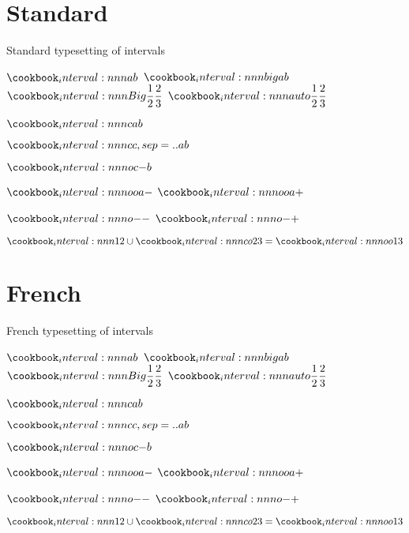 \documentclass[varwidth, border = 3pt]{standalone}
\begin{document}
\section*{Standard}
Standard typesetting of intervals

$\interval{a,b}$\quad
$\interval[big]{a,b}$\quad
$\interval[Big]{\dfrac{1}{2},\dfrac{2}{3}}$\quad
$\interval[auto]{\dfrac{1}{2},\dfrac{2}{3}}$

$\interval[c]{a,b}$

$\interval[cc,sep=..]{a,b}$

$\interval[oc]{-,b}$

$\interval[oo]{a,-}$\qquad
$\interval[oo]{a,+}$

$\interval[o]{-,-}$\qquad
$\interval[o]{-,+}$

$\interval{1,2}\cup\interval[co]{2,3}=\interval[oo]{1,3}$

\section*{French}
French typesetting of intervals


$\interval{a,b}$\quad
$\interval[big]{a,b}$\quad
$\interval[Big]{\dfrac{1}{2},\dfrac{2}{3}}$\quad
$\interval[auto]{\dfrac{1}{2},\dfrac{2}{3}}$

$\interval[c]{a,b}$

$\interval[cc,sep=..]{a,b}$

$\interval[oc]{-,b}$

$\interval[oo]{a,-}$\qquad
$\interval[oo]{a,+}$

$\interval[o]{-,-}$\qquad
$\interval[o]{-,+}$

$\interval{1,2}\cup\interval[co]{2,3}=\interval[oo]{1,3}$
\end{document}
